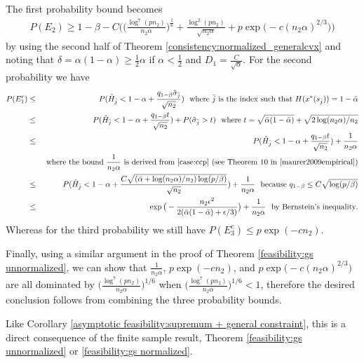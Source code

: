 \documentclass[mnsc,blindrev]{informs4} %
\begin{document}
The first probability bound becomes
\begin{eqnarray*}
P(E_2)\geq 1-\beta-C\Big(\Big(\frac{\log^7(pn_2)}{n_2\alpha}\Big)^{\frac{1}{6}}+\frac{\log^2 (pn_2)}{\sqrt{n_2\alpha}}+p\exp\big(-c(n_2\alpha)^{2/3}\big)\Big)
\end{eqnarray*}
by using the second half of Theorem \ref{consistency:normalized_generalcvx} and noting that $\delta=\alpha(1-\alpha)\geq \frac{1}{2}\alpha$ if $\alpha<\frac{1}{2}$ and $D_1=\frac{C}{\sqrt \alpha}$. For the second probability we have
\begin{eqnarray*}
P(E_1^c)&\leq&P(\hat H_{\bar{j}}< 1-\alpha + \frac{ q_{1-\beta}\hat\sigma_{\bar{j}}}{\sqrt{n_2}})\text{\ \ where $\bar{j}$ is the index such that }H(x^*(s_{\bar{j}}))=1-\bar{\alpha}\\
&\leq&P(\hat H_{\bar{j}}< 1-\alpha + \frac{ q_{1-\beta}t}{\sqrt{n_2}})+P(\hat\sigma_{\bar{j}}>t)\text{\ \  where }t=\sqrt{\bar{\alpha}(1-\bar{\alpha})}+\sqrt{2\log(n_2\alpha)/n_2}\\
&\leq &P(\hat H_{\bar{j}}< 1-\alpha + \frac{ q_{1-\beta}t}{\sqrt{n_2}})+\frac{1}{n_2\alpha}\\
&&\text{\ where the bound $\frac{1}{n_2\alpha}$ is derived from \eqref{case:ccp} (see Theorem 10 in \cite{maurer2009empirical})}\\
&\leq &P(\hat H_{\bar{j}}< 1-\alpha + \frac{C\sqrt{(\bar{\alpha}+\log(n_2\alpha)/n_2)\log(p/\beta)}}{\sqrt{n_2}})+\frac{1}{n_2\alpha}\text{\ \ because }q_{1-\beta}\leq C\sqrt{\log(p/\beta)}\\
&\leq&\exp\big(-\frac{n_2\epsilon^2}{2(\bar{\alpha}(1-\bar{\alpha})+\epsilon/3)}\big)+\frac{1}{n_2\alpha}\text{\ \ by Bernstein's inequality}.
\end{eqnarray*}
Whereas for the third probability we still have $P(E_3^c)\leq p\exp(-cn_2)$.

Finally, using a similar argument in the proof of Theorem \ref{feasibility:gs unnormalized}, we can show that $\frac{1}{n_2\alpha}$, $p\exp(-cn_2)$, and $p\exp\big(-c(n_2\alpha)^{2/3}\big)$ are all dominated by $\Big(\frac{\log^7(pn_2)}{n_2\alpha}\Big)^{1/6}$ when $\Big(\frac{\log^7(pn_2)}{n_2\alpha}\Big)^{1/6}<1$, therefore the desired conclusion follows from combining the three probability bounds.\hfill\Halmos

Like Corollary \ref{asymptotic feasibility:supremum + general constraint}, this is a direct consequence of the finite sample result, Theorem \ref{feasibility:gs unnormalized} or \ref{feasibility:gs normalized}.\hfill\Halmos
\end{document}
